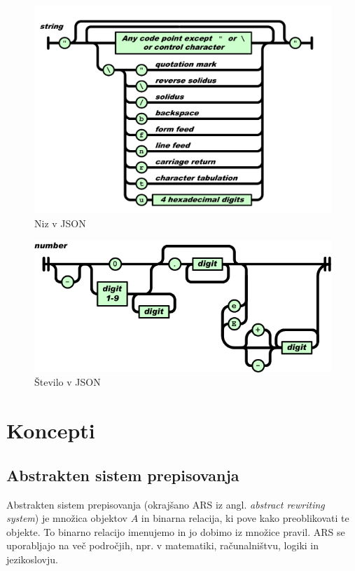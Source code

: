 \documentclass[12pt,titlepage]{report}
\newcommand{\angokr}[2]{(okrajšano #1 iz angl. \emph{#2})}
\begin{document}
			\begin{figure}[H]
				\centering
				\includegraphics[width=\textwidth]{json_string.png}
				\caption{Niz v JSON\cite{ecma404}}
				\label{fig:json_str}
			\end{figure}
			\begin{figure}[H]
				\centering
				\includegraphics[width=\textwidth]{json_number.png}
				\caption{Število v JSON\cite{ecma404}}
				\label{fig:json_num}
			\end{figure}
	\section{Koncepti} %
		\subsection{Abstrakten sistem prepisovanja}
			Abstrakten sistem prepisovanja \angokr{ARS}{abstract rewriting system} je množica objektov $A$ in binarna relacija, ki pove kako preoblikovati te objekte.
			To binarno relacijo imenujemo  \cite[chapter, p.~7]{terese} in jo dobimo iz množice pravil.
			ARS se uporabljajo na več področjih, npr. v matematiki, računalništvu, logiki in jezikoslovju.
\end{document}
